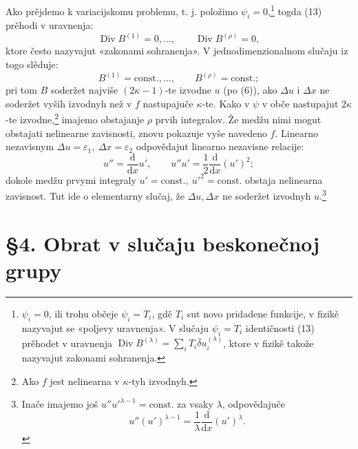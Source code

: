 \documentclass[11pt]{article}
\providecommand{\eps}{\varepsilon}
\providecommand{\D}{\Delta}
\providecommand{\dd}{\mathrm d}
\DeclareMathOperator{\Div}{Div}
\providecommand{\bd}{\bar{\delta}}
\begin{document}
Ako prějdemo k variacijskomu problemu, t. j. položimo \(\psi_i=0\),\footnote{\(\psi_i=0\), ili trohu občeje \(\psi_i=T_i\), gdě \(T_i\) sut novo pridadene funkcije, v fizikě nazyvajut se «poljevy uravnenja». V slučaju \(\psi_i=T_i\) identičnosti (13) prěhodet v uravnenja \(\Div B^{(\lambda)}=\sum_i T_i\bd u_i^{(\lambda)}\), ktore v fizikě takože nazyvajut zakonami sohranenja.} togda (13) prěhodi v uravnenja:
\[
\Div B^{(1)}=0,\ldots,\qquad \Div B^{(\rho)}=0,
\]
ktore često nazyvajut «zakonami sohranenja». V jednodimenzionalnom slučaju iz togo slěduje:
\[
B^{(1)}=\mathrm{const.},\ldots,\qquad B^{(\rho)}=\mathrm{const.};
\]
pri tom \(B\) soderžet najviše \((2\kappa-1)\)-te izvodne \(u\) (po (6)), ako \(\D u\) i \(\D x\) ne soderžet vyših izvodnyh než v \(f\) nastupajuče \(\kappa\)-te. Kako v \(\psi\) v obče nastupajut \(2\kappa\)-te izvodne,\footnote{Ako \(f\) jest nelinearna v \(\kappa\)-tyh izvodnyh.} imajemo obstajanje \(\rho\) prvih integralov. Že medžu nimi mogut obstajati nelinearne zavisnosti, znovu pokazuje vyše navedeno \(f\). Linearno nezavisnym \(\D u=\eps_1,\ \D x=\eps_2\) odpovědajut linearno nezavisne relacije:
\[
u''=\frac{\dd}{\dd x}u',\qquad
u''u'=\frac12\frac{\dd}{\dd x}(u')^2;
\]
dokole medžu prvymi integraly \(u'=\mathrm{const.},\ u'^2=\mathrm{const.}\) obstaja nelinearna zavisnost. Tut ide o elementarny slučaj, že \(\D u,\D x\) ne soderžet izvodnyh \(u\).\footnote{Inače imajemo još \(u''u'^{\lambda-1}=\mathrm{const.}\) za vsaky \(\lambda\), odpovědajuče
\[
u''(u')^{\lambda-1}=\frac1\lambda\frac{\dd}{\dd x}(u')^\lambda.
\]}

\section*{\S{}4. Obrat v slučaju beskonečnoj grupy}
\end{document}
